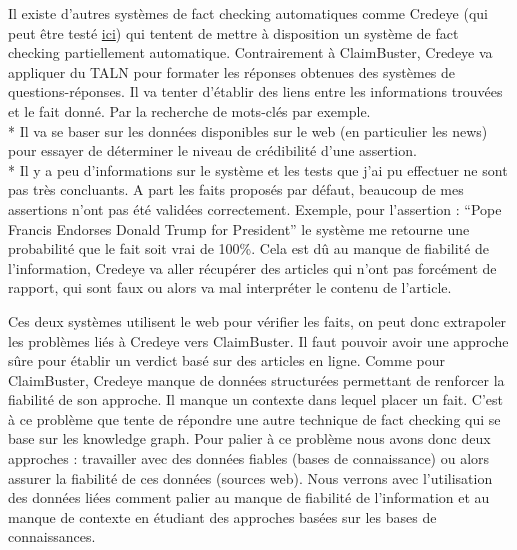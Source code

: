 Il existe d'autres systèmes de fact checking automatiques comme Credeye \cite{popat2018credeye} (qui peut être testé \href{https://gate.d5.mpi-inf.mpg.de/credeye/}{ici}) qui tentent de mettre à disposition un système de fact checking partiellement automatique. Contrairement à ClaimBuster, Credeye va appliquer du TALN pour formater les réponses obtenues des systèmes de questions-réponses. Il va tenter d'établir des liens entre les informations trouvées et le fait donné. Par la recherche de mots-clés par exemple.
\\*
Il va se baser sur les données disponibles sur le web (en particulier les news) pour essayer de déterminer le niveau de crédibilité d'une assertion. 
\\*
Il y a peu d'informations sur le système et les tests que j'ai pu effectuer ne sont pas très concluants. A part les faits proposés par défaut, beaucoup de mes assertions n'ont pas été validées correctement. Exemple, pour l'assertion : \enquote{Pope Francis Endorses Donald Trump for President} le système me retourne une probabilité que le fait soit vrai de 100\%. Cela est dû au manque de fiabilité de l'information, Credeye va aller récupérer des articles qui n'ont pas forcément de rapport, qui sont faux ou alors va mal interpréter le contenu de l'article.

Ces deux systèmes utilisent le web pour vérifier les faits, on peut donc extrapoler les problèmes liés à Credeye vers ClaimBuster. Il faut pouvoir avoir une approche sûre pour établir un verdict basé sur des articles en ligne. Comme pour ClaimBuster, Credeye manque de données structurées permettant de renforcer la fiabilité de son approche. Il manque un contexte dans lequel placer un fait. C'est à ce problème que tente de répondre une autre technique de fact checking qui se base sur les knowledge graph. Pour palier à ce problème nous avons donc deux approches : travailler avec des données fiables (bases de connaissance) ou alors assurer la fiabilité de ces données (sources web). Nous verrons avec l'utilisation des données liées comment palier au manque de fiabilité de l'information et au manque de contexte en étudiant des approches basées sur les bases de connaissances.